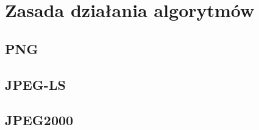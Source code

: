\section{Zasada działania algorytmów}

\subsection{PNG}

\subsection{JPEG-LS}

\subsection{JPEG2000}